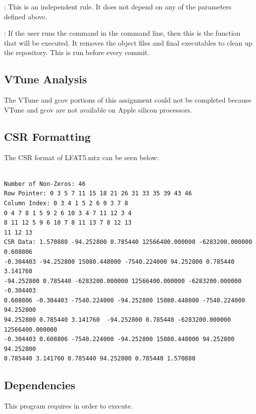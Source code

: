 \documentclass[12pt]{article}
\begin{document}
: This is an independent rule. It does not depend on any of the parameters defined above.

: If the user runs the command  in the command line, then this is the function that will be executed. It removes the object files and final executables to clean up the repository. This is run before every commit.

\subsection{VTune Analysis}

The VTune and gcov portions of this assignment could not be completed because VTune and gcov are not available on Apple silicon processors.

\subsection{CSR Formatting}

The CSR format of LFAT5.mtx can be seen below:

 	\begin{mdframed}[style=myboxstyleTerminal1]
		\begin{verbatim}

Number of Non-Zeros: 46
Row Pointer: 0 3 5 7 11 15 18 21 26 31 33 35 39 43 46 
Column Index: 0 3 4 1 5 2 6 0 3 7 8 
0 4 7 8 1 5 9 2 6 10 3 4 7 11 12 3 4 
8 11 12 5 9 6 10 7 8 11 13 7 8 12 13 
11 12 13 
CSR Data: 1.570880 -94.252800 0.785440 12566400.000000 -6283200.000000 0.608806
-0.304403 -94.252800 15080.448000 -7540.224000 94.252800 0.785440 3.141760
-94.252800 0.785440 -6283200.000000 12566400.000000 -6283200.000000 -0.304403
0.608806 -0.304403 -7540.224000 -94.252800 15080.448000 -7540.224000 94.252800
94.252800 0.785440 3.141760  -94.252800 0.785440 -6283200.000000 12566400.000000
-0.304403 0.608806 -7540.224000 -94.252800 15080.448000 94.252800 94.252800
0.785440 3.141760 0.785440 94.252800 0.785440 1.570880

		\end{verbatim}
	\end{mdframed}

\subsection{Dependencies}

This program requires  in order to execute. 
\end{document}

